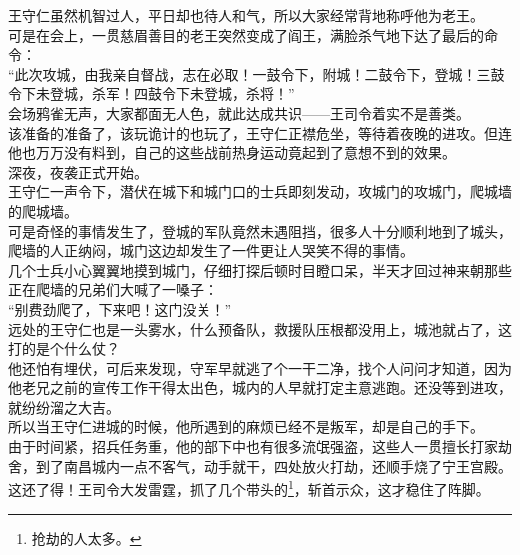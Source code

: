 \begin{multicols}{\theparacolNo}
王守仁虽然机智过人，平日却也待人和气，所以大家经常背地称呼他为老王。\\

可是在会上，一贯慈眉善目的老王突然变成了阎王，满脸杀气地下达了最后的命令：\\

“此次攻城，由我亲自督战，志在必取！一鼓令下，附城！二鼓令下，登城！三鼓令下未登城，杀军！四鼓令下未登城，杀将！”\\

会场鸦雀无声，大家都面无人色，就此达成共识——王司令着实不是善类。\\

该准备的准备了，该玩诡计的也玩了，王守仁正襟危坐，等待着夜晚的进攻。但连他也万万没有料到，自己的这些战前热身运动竟起到了意想不到的效果。\\

深夜，夜袭正式开始。\\

王守仁一声令下，潜伏在城下和城门口的士兵即刻发动，攻城门的攻城门，爬城墙的爬城墙。\\

可是奇怪的事情发生了，登城的军队竟然未遇阻挡，很多人十分顺利地到了城头，爬墙的人正纳闷，城门这边却发生了一件更让人哭笑不得的事情。\\

几个士兵小心翼翼地摸到城门，仔细打探后顿时目瞪口呆，半天才回过神来朝那些正在爬墙的兄弟们大喊了一嗓子：\\

“别费劲爬了，下来吧！这门没关！”\\

远处的王守仁也是一头雾水，什么预备队，救援队压根都没用上，城池就占了，这打的是个什么仗？\\

他还怕有埋伏，可后来发现，守军早就逃了个一干二净，找个人问问才知道，因为他老兄之前的宣传工作干得太出色，城内的人早就打定主意逃跑。还没等到进攻，就纷纷溜之大吉。\\

所以当王守仁进城的时候，他所遇到的麻烦已经不是叛军，却是自己的手下。\\

由于时间紧，招兵任务重，他的部下中也有很多流氓强盗，这些人一贯擅长打家劫舍，到了南昌城内一点不客气，动手就干，四处放火打劫，还顺手烧了宁王宫殿。\\

这还了得！王司令大发雷霆，抓了几个带头的\footnote{抢劫的人太多。}，斩首示众，这才稳住了阵脚。\\


\end{multicols}
